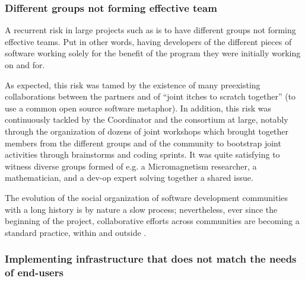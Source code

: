 


\subsubsection{Different groups not forming effective team}


A recurrent risk in large projects such as \ODK is to have different
groups not forming effective teams. Put in other words, having
developers of the different pieces of software working solely for the
benefit of the program they were initially working on and for.

As expected, this risk was tamed by the existence of many preexisting
collaborations between the partners and of ``joint itches to scratch
together'' (to use a common open source software metaphor). In
addition, this risk was continuously tackled by the Coordinator and
the consortium at large, notably through the organization of dozens of
joint workshops which brought together members from the different
groups and of the community to bootstrap joint activities through
brainstorms and coding sprints. It was quite satisfying to witness
diverse groups formed of e.g. a Micromagnetism researcher, a
mathematician, and a dev-op expert solving together a shared issue.

The evolution of the social organization of software development
communities with a long history is by nature a slow process;
nevertheless, ever since the beginning of the project, collaborative
efforts across communities are becoming a standard practice, within
and outside \ODK.


\subsubsection{Implementing infrastructure that does not match the needs of end-users}

